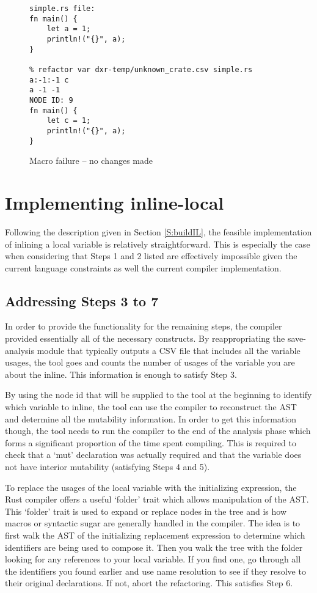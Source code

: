 \begin{figure}[H]
\centering
\begin{verbatim}
simple.rs file:
fn main() {
    let a = 1;
    println!("{}", a);
}

% refactor var dxr-temp/unknown_crate.csv simple.rs  a:-1:-1 c
a -1 -1
NODE ID: 9
fn main() {
    let c = 1;
    println!("{}", a);
}
\end{verbatim}
\caption{Macro failure -- no changes made}
\end{figure}

\section{Implementing inline-local}\label{S:ill}
Following the description given in Section \ref{S:buildIL}, the feasible implementation of inlining a local variable is relatively straightforward. This is especially the case when considering that Steps 1 and 2 listed are effectively impossible given the current language constraints as well the current compiler implementation.

\subsection{Addressing Steps 3 to 7}
In order to provide the functionality for the remaining steps, the compiler provided essentially all of the necessary constructs. By reappropriating the save-analysis module that typically outputs a CSV file that includes all the variable usages, the tool goes and counts the number of usages of the variable you are about the inline. This information is enough to satisfy Step 3.

By using the node id that will be supplied to the tool at the beginning to identify which variable to inline, the tool can use the compiler to reconstruct the AST and determine all the mutability information. In order to get this information though, the tool needs to run the compiler to the end of the analysis phase which forms a significant proportion of the time spent compiling. This is required to check that a `mut' declaration was actually required and that the variable does not have interior mutability (satisfying Steps 4 and 5).

To replace the usages of the local variable with the initializing expression, the Rust compiler offers a useful `folder' trait which allows manipulation of the AST. This `folder' trait is used to expand or replace nodes in the tree and is how macros or syntactic sugar are generally handled in the compiler. The idea is to first walk the AST of the initializing replacement expression to determine which identifiers are being used to compose it. Then you walk the tree with the folder looking for any references to your local variable. If you find one, go through all the identifiers you found earlier and use name resolution to see if they resolve to their original declarations. If not, abort the refactoring. This satisfies Step 6.

